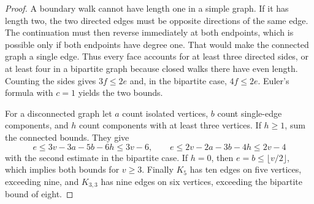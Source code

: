 \documentclass[11pt,oneside,openany]{book}
\theoremstyle{plain}
\theoremstyle{definition}
\theoremstyle{remark}
\begin{document}
\begin{proof}
A boundary walk cannot have length one in a simple graph.
If it has length two, the two directed edges must be opposite
directions of the same edge. The continuation must then reverse
immediately at both endpoints, which is possible only if both
endpoints have degree one. That would make the connected graph
a single edge. Thus every face accounts for at least three
directed sides, or at least four in a bipartite graph because
closed walks there have even length. Counting the sides gives
\(3f\le2e\) and, in the bipartite case, \(4f\le2e\).
Euler's formula with \(c=1\) yields the two bounds.

For a disconnected graph let \(a\) count isolated vertices,
\(b\) count single-edge components, and \(h\) count components
with at least three vertices. If \(h\ge1\), sum the connected
bounds. They give
\[
 e\le 3v-3a-5b-6h\le3v-6,\qquad
 e\le 2v-2a-3b-4h\le2v-4
\]
with the second estimate in the bipartite case. If \(h=0\), then
\(e=b\le\lfloor v/2\rfloor\), which implies both bounds for
\(v\ge3\). Finally \(K_5\) has ten edges on five vertices,
exceeding nine, and \(K_{3,3}\) has nine edges on six vertices,
exceeding the bipartite bound of eight.
\end{proof}
\end{document}
